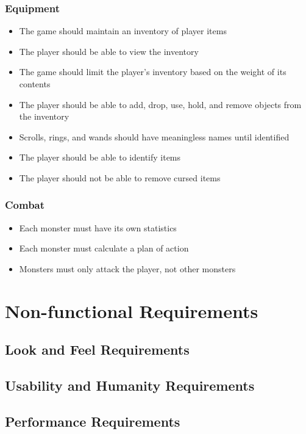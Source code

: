 \documentclass[12pt, titlepage]{article}
\begin{document}
		\subsubsection{Equipment}
			\begin{itemize}
				\item The game should maintain an inventory of player items
				\item The player should be able to view the inventory
				\item The game should limit the player's inventory based on the weight of its contents
				\item The player should be able to add, drop, use, hold, and remove objects from the inventory
				\item Scrolls, rings, and wands should have meaningless names until identified
				\item The player should be able to identify items
				\item The player should not be able to remove cursed items
			\end{itemize}

		\subsubsection{Combat}
		\begin{itemize}
			\item Each monster must have its own statistics
			\item Each monster must calculate a plan of action
			\item Monsters must only attack the player, not other monsters

		\end{itemize}

\section{Non-functional Requirements}

	\subsection{Look and Feel Requirements}

	\subsection{Usability and Humanity Requirements}

	\subsection{Performance Requirements}
\end{document}
